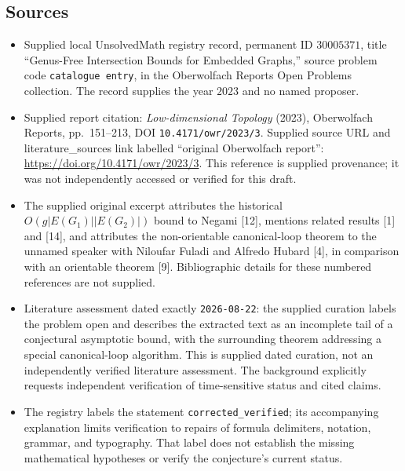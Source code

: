 \documentclass[11pt]{article}
\begin{document}
\subsection{Sources}
\begin{itemize}
\item Supplied local UnsolvedMath registry record, permanent ID \(30005371\), title ``Genus-Free Intersection Bounds for Embedded Graphs,'' source problem code \texttt{catalogue entry}, in the Oberwolfach Reports Open Problems collection. The record supplies the year \(2023\) and no named proposer.
\item Supplied report citation: \emph{Low-dimensional Topology} (2023), Oberwolfach Reports, pp.\ 151--213, DOI \texttt{10.4171/owr/2023/3}. Supplied source URL and literature\_sources link labelled ``original Oberwolfach report'': \url{https://doi.org/10.4171/owr/2023/3}. This reference is supplied provenance; it was not independently accessed or verified for this draft.
\item The supplied original excerpt attributes the historical \(O(g|E(G_1)||E(G_2)|)\) bound to Negami [12], mentions related results [1] and [14], and attributes the non-orientable canonical-loop theorem to the unnamed speaker with Niloufar Fuladi and Alfredo Hubard [4], in comparison with an orientable theorem [9]. Bibliographic details for these numbered references are not supplied.
\item Literature assessment dated exactly \texttt{2026-08-22}: the supplied curation labels the problem open and describes the extracted text as an incomplete tail of a conjectural asymptotic bound, with the surrounding theorem addressing a special canonical-loop algorithm. This is supplied dated curation, not an independently verified literature assessment. The background explicitly requests independent verification of time-sensitive status and cited claims.
\item The registry labels the statement \texttt{corrected\_verified}; its accompanying explanation limits verification to repairs of formula delimiters, notation, grammar, and typography. That label does not establish the missing mathematical hypotheses or verify the conjecture's current status.
\end{itemize}
\end{document}

